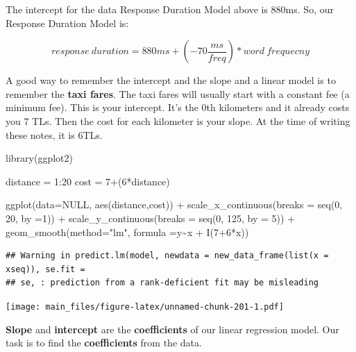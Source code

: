 \documentclass[
]{book}
\newenvironment{Shaded}{\begin{snugshade}}{\end{snugshade}}
\newcommand{\AttributeTok}[1]{\textcolor[rgb]{0.77,0.63,0.00}{#1}}
\newcommand{\ConstantTok}[1]{\textcolor[rgb]{0.00,0.00,0.00}{#1}}
\newcommand{\DecValTok}[1]{\textcolor[rgb]{0.00,0.00,0.81}{#1}}
\newcommand{\FunctionTok}[1]{\textcolor[rgb]{0.00,0.00,0.00}{#1}}
\newcommand{\NormalTok}[1]{#1}
\newcommand{\OtherTok}[1]{\textcolor[rgb]{0.56,0.35,0.01}{#1}}
\newcommand{\SpecialCharTok}[1]{\textcolor[rgb]{0.00,0.00,0.00}{#1}}
\newcommand{\StringTok}[1]{\textcolor[rgb]{0.31,0.60,0.02}{#1}}
\begin{document}
The intercept for the data Response Duration Model above is 880ms. So, our Response Duration Model is:

\[response\ duration = 880ms + (-70 \frac{ms}{freq}) * word\ frequecny   \]

A good way to remember the intercept and the slope and a linear model is to remember the \textbf{taxi fares}. The taxi fares will usually start with a constant fee (a minimum fee). This is your intercept. It's the 0th kilometers and it already costs you 7 TLs. Then the cost for each kilometer is your slope. At the time of writing these notes, it is 6TLs.

\begin{Shaded}
\begin{Highlighting}[]
\FunctionTok{library}\NormalTok{(ggplot2)}

\NormalTok{distance }\OtherTok{=} \DecValTok{1}\SpecialCharTok{:}\DecValTok{20}
\NormalTok{cost }\OtherTok{=} \DecValTok{7}\SpecialCharTok{+}\NormalTok{(}\DecValTok{6}\SpecialCharTok{*}\NormalTok{distance)}

\FunctionTok{ggplot}\NormalTok{(}\AttributeTok{data=}\ConstantTok{NULL}\NormalTok{, }\FunctionTok{aes}\NormalTok{(distance,cost)) }\SpecialCharTok{+}
  \FunctionTok{scale\_x\_continuous}\NormalTok{(}\AttributeTok{breaks =} \FunctionTok{seq}\NormalTok{(}\DecValTok{0}\NormalTok{, }\DecValTok{20}\NormalTok{, }\AttributeTok{by =}\DecValTok{1}\NormalTok{)) }\SpecialCharTok{+}
  \FunctionTok{scale\_y\_continuous}\NormalTok{(}\AttributeTok{breaks =} \FunctionTok{seq}\NormalTok{(}\DecValTok{0}\NormalTok{, }\DecValTok{125}\NormalTok{, }\AttributeTok{by =} \DecValTok{5}\NormalTok{)) }\SpecialCharTok{+} 
  \FunctionTok{geom\_smooth}\NormalTok{(}\AttributeTok{method=}\StringTok{"lm"}\NormalTok{, }\AttributeTok{formula =}\NormalTok{y}\SpecialCharTok{\textasciitilde{}}\NormalTok{x }\SpecialCharTok{+} \FunctionTok{I}\NormalTok{(}\DecValTok{7}\SpecialCharTok{+}\DecValTok{6}\SpecialCharTok{*}\NormalTok{x))}
\end{Highlighting}
\end{Shaded}

\begin{verbatim}
## Warning in predict.lm(model, newdata = new_data_frame(list(x = xseq)), se.fit =
## se, : prediction from a rank-deficient fit may be misleading
\end{verbatim}

\texttt{[image: main\_files/figure-latex/unnamed-chunk-201-1.pdf]}

\textbf{Slope} and \textbf{intercept} are the \textbf{coefficients} of our linear regression model. Our task is to find the \textbf{coefficients} from the data.
\end{document}
